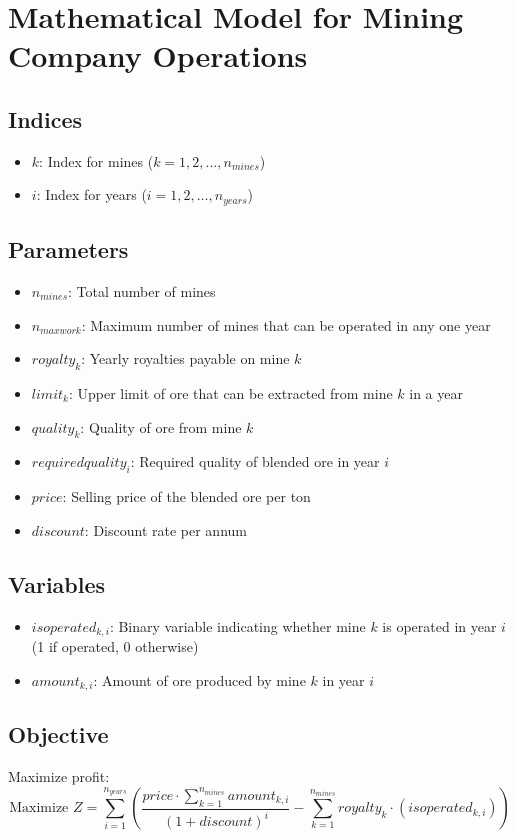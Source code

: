 \documentclass{article}
\begin{document}
\section*{Mathematical Model for Mining Company Operations}

\subsection*{Indices}
\begin{itemize}
    \item $k$: Index for mines ($k = 1, 2, \ldots, n_{mines}$)
    \item $i$: Index for years ($i = 1, 2, \ldots, n_{years}$)
\end{itemize}

\subsection*{Parameters}
\begin{itemize}
    \item $n_{mines}$: Total number of mines
    \item $n_{maxwork}$: Maximum number of mines that can be operated in any one year
    \item $royalty_k$: Yearly royalties payable on mine $k$
    \item $limit_k$: Upper limit of ore that can be extracted from mine $k$ in a year
    \item $quality_k$: Quality of ore from mine $k$
    \item $requiredquality_i$: Required quality of blended ore in year $i$
    \item $price$: Selling price of the blended ore per ton
    \item $discount$: Discount rate per annum
\end{itemize}

\subsection*{Variables}
\begin{itemize}
    \item $isoperated_{k,i}$: Binary variable indicating whether mine $k$ is operated in year $i$ (1 if operated, 0 otherwise)
    \item $amount_{k,i}$: Amount of ore produced by mine $k$ in year $i$
\end{itemize}

\subsection*{Objective}
Maximize profit:
\[
\text{Maximize } Z = \sum_{i=1}^{n_{years}} \left( \frac{price \cdot \sum_{k=1}^{n_{mines}} amount_{k,i}}{(1 + discount)^i} - \sum_{k=1}^{n_{mines}} royalty_k \cdot (isoperated_{k,i}) \right)
\]
\end{document}
